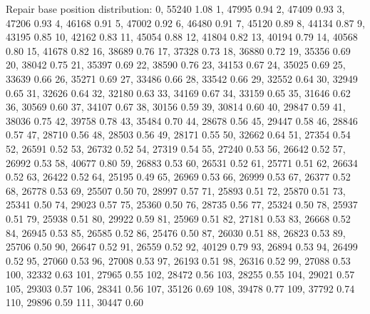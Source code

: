 Repair base position distribution:
0,      55240   1.08 %
1,      47995   0.94 %
2,      47409   0.93 %
3,      47206   0.93 %
4,      46168   0.91 %
5,      47002   0.92 %
6,      46480   0.91 %
7,      45120   0.89 %
8,      44134   0.87 %
9,      43195   0.85 %
10,     42162   0.83 %
11,     45054   0.88 %
12,     41804   0.82 %
13,     40194   0.79 %
14,     40568   0.80 %
15,     41678   0.82 %
16,     38689   0.76 %
17,     37328   0.73 %
18,     36880   0.72 %
19,     35356   0.69 %
20,     38042   0.75 %
21,     35397   0.69 %
22,     38590   0.76 %
23,     34153   0.67 %
24,     35025   0.69 %
25,     33639   0.66 %
26,     35271   0.69 %
27,     33486   0.66 %
28,     33542   0.66 %
29,     32552   0.64 %
30,     32949   0.65 %
31,     32626   0.64 %
32,     32180   0.63 %
33,     34169   0.67 %
34,     33159   0.65 %
35,     31646   0.62 %
36,     30569   0.60 %
37,     34107   0.67 %
38,     30156   0.59 %
39,     30814   0.60 %
40,     29847   0.59 %
41,     38036   0.75 %
42,     39758   0.78 %
43,     35484   0.70 %
44,     28678   0.56 %
45,     29447   0.58 %
46,     28846   0.57 %
47,     28710   0.56 %
48,     28503   0.56 %
49,     28171   0.55 %
50,     32662   0.64 %
51,     27354   0.54 %
52,     26591   0.52 %
53,     26732   0.52 %
54,     27319   0.54 %
55,     27240   0.53 %
56,     26642   0.52 %
57,     26992   0.53 %
58,     40677   0.80 %
59,     26883   0.53 %
60,     26531   0.52 %
61,     25771   0.51 %
62,     26634   0.52 %
63,     26422   0.52 %
64,     25195   0.49 %
65,     26969   0.53 %
66,     26999   0.53 %
67,     26377   0.52 %
68,     26778   0.53 %
69,     25507   0.50 %
70,     28997   0.57 %
71,     25893   0.51 %
72,     25870   0.51 %
73,     25341   0.50 %
74,     29023   0.57 %
75,     25360   0.50 %
76,     28735   0.56 %
77,     25324   0.50 %
78,     25937   0.51 %
79,     25938   0.51 %
80,     29922   0.59 %
81,     25969   0.51 %
82,     27181   0.53 %
83,     26668   0.52 %
84,     26945   0.53 %
85,     26585   0.52 %
86,     25476   0.50 %
87,     26030   0.51 %
88,     26823   0.53 %
89,     25706   0.50 %
90,     26647   0.52 %
91,     26559   0.52 %
92,     40129   0.79 %
93,     26894   0.53 %
94,     26499   0.52 %
95,     27060   0.53 %
96,     27008   0.53 %
97,     26193   0.51 %
98,     26316   0.52 %
99,     27088   0.53 %
100,    32332   0.63 %
101,    27965   0.55 %
102,    28472   0.56 %
103,    28255   0.55 %
104,    29021   0.57 %
105,    29303   0.57 %
106,    28341   0.56 %
107,    35126   0.69 %
108,    39478   0.77 %
109,    37792   0.74 %
110,    29896   0.59 %
111,    30447   0.60 %
